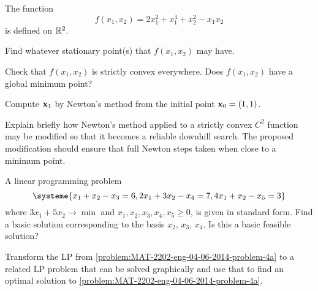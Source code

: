\titlebox[norsk]

\Problem

The function
%
\begin{equation}
    f(x_1, x_2) = 2x_1^2 + x_1^4 + x_2^2 - x_1 x_2
\end{equation}
%
is defined on $\mathbb{R}^2$.

\begin{subproblem}
    Find whatever stationary point(s) that $f(x_1,x_2)$ may have.
\end{subproblem}

\begin{subproblem}
    Check that $f(x_1,x_2)$ is strictly convex everywhere. Does $f(x_1, x_2)$ have a global minimum point?
\end{subproblem}

\begin{subproblem}
    Compute $\mathbf{x}_1$ by Newton's method from the initial point $\mathbf{x}_0 = (1,1)$.
\end{subproblem}

\begin{subproblem}
    Explain briefly how Newton's method applied to a strictly convex $C^2$ function may be modified so that it becomes a reliable downhill search. The proposed modification should ensure that full Newton steps taken when close to a minimum point.
\end{subproblem}


\Problem

\begin{subproblem}
    \label{problem:MAT-2202-eng-04-06-2014-problem-4a}
    A linear programming problem
    \begin{equation*}
        \systeme{
            x_1 + x_2 - x_3 = 6,
            2x_1 + 3x_2 - x_4 = 7,
            4x_1 + x_2 - x_5 = 3
        }
    \end{equation*}
    where $3x_1 + 5x_2 \to \min$ and $x_1,x_2,x_3,x_4,x_5 \geq 0$, is given in standard form. Find a basic solution corresponding to the basis $x_2$,  $x_3$, $x_4$. Is this a basic feasible solution?
\end{subproblem}

\begin{subproblem}
    Transform the LP from \cref{problem:MAT-2202-eng-04-06-2014-problem-4a} to a related LP problem that can be solved graphically and use that to find an optimal solution to \cref{problem:MAT-2202-eng-04-06-2014-problem-4a}. 
\end{subproblem}

